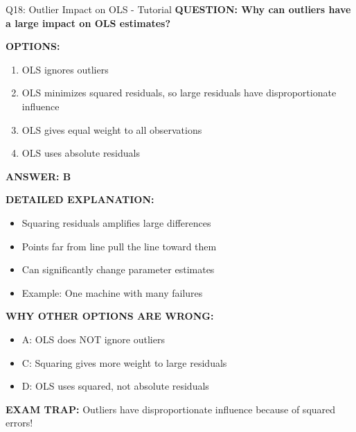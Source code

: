 \documentclass[8pt]{beamer}
\begin{document}
	\begin{frame}{Q18: Outlier Impact on OLS - Tutorial}
		\fontsize{6.5}{7.5}\selectfont
		\textbf{QUESTION: Why can outliers have a large impact on OLS estimates?}
		
		\vspace{0.1cm}
		\textbf{OPTIONS:}
		\begin{enumerate}
			\item OLS ignores outliers
			\item OLS minimizes squared residuals, so large residuals have disproportionate influence
			\item OLS gives equal weight to all observations
			\item OLS uses absolute residuals
		\end{enumerate}
		
		\vspace{0.1cm}
		\textcolor{myblue}{\textbf{ANSWER: B}}
		
		\vspace{0.1cm}
		\textbf{DETAILED EXPLANATION:}
		\begin{itemize}
			\item Squaring residuals amplifies large differences
			\item Points far from line pull the line toward them
			\item Can significantly change parameter estimates
			\item Example: One machine with many failures
		\end{itemize}
		
		\vspace{0.1cm}
		\textcolor{myred}{\textbf{WHY OTHER OPTIONS ARE WRONG:}}
		\begin{itemize}
			\item \textcolor{myred}{A:} OLS does NOT ignore outliers
			\item \textcolor{myred}{C:} Squaring gives more weight to large residuals
			\item \textcolor{myred}{D:} OLS uses squared, not absolute residuals
		\end{itemize}
		
		\textcolor{myred}{\textbf{EXAM TRAP:}} Outliers have \textcolor{myblue}{disproportionate influence} because of squared errors!
	\end{frame}
	
\end{document}

